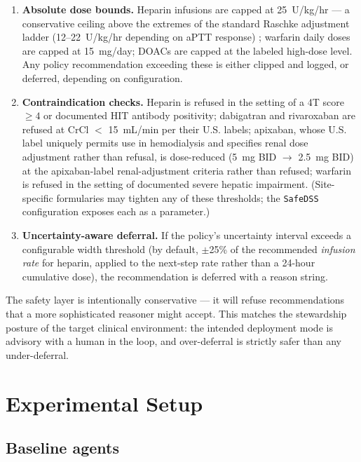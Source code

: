 \documentclass[11pt]{article}
\begin{document}
\begin{enumerate}
  \item \textbf{Absolute dose bounds.} Heparin infusions are capped at 25~U/kg/hr --- a conservative ceiling above the extremes of the standard Raschke adjustment ladder (12--22~U/kg/hr depending on aPTT response) \citep{raschke1993}; warfarin daily doses are capped at 15~mg/day; DOACs are capped at the labeled high-dose level. Any policy recommendation exceeding these is either clipped and logged, or deferred, depending on configuration.
  \item \textbf{Contraindication checks.} Heparin is refused in the setting of a 4T score $\geq 4$ or documented HIT antibody positivity; dabigatran and rivaroxaban are refused at CrCl $<$ 15~mL/min per their U.S. labels; apixaban, whose U.S. label uniquely permits use in hemodialysis and specifies renal dose adjustment rather than refusal, is dose-reduced (5~mg BID $\to$ 2.5~mg BID) at the apixaban-label renal-adjustment criteria rather than refused; warfarin is refused in the setting of documented severe hepatic impairment. (Site-specific formularies may tighten any of these thresholds; the \texttt{SafeDSS} configuration exposes each as a parameter.)
  \item \textbf{Uncertainty-aware deferral.} If the policy's uncertainty interval exceeds a configurable width threshold (by default, $\pm$25\% of the recommended \emph{infusion rate} for heparin, applied to the next-step rate rather than a 24-hour cumulative dose), the recommendation is deferred with a reason string.
\end{enumerate}

The safety layer is intentionally conservative --- it will refuse recommendations that a more sophisticated reasoner might accept. This matches the stewardship posture of the target clinical environment: the intended deployment mode is advisory with a human in the loop, and over-deferral is strictly safer than any under-deferral.

\section{Experimental Setup}
\label{sec:experimental}

\subsection{Baseline agents}
\end{document}
